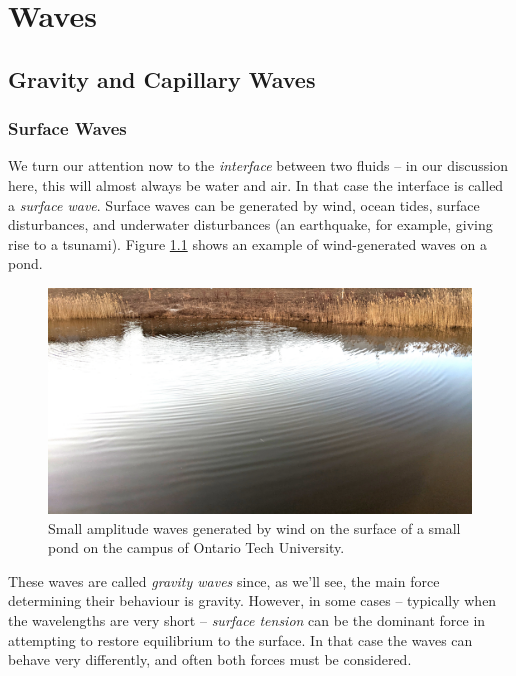 \chapter{Waves}

%
%

\section{Gravity and Capillary Waves}



\subsection{Surface Waves}

We turn our attention now to the \emph{interface} between two fluids -- in our discussion here, this will almost always be water and air.  In that case the interface is called a \emph{surface wave}.  Surface waves can be generated by wind, ocean tides, surface disturbances, and underwater disturbances (an earthquake, for example, giving rise to a tsunami).  Figure \ref{fig_pond} shows an example of wind-generated waves on a pond.  

\begin{figure}
\centering\includegraphics[width=0.9\linewidth]{Figures/Chapter5/fig_pond_waves}
\caption{Small amplitude waves generated by wind on the surface of a small pond on the campus of Ontario Tech University.}
\label{fig_pond}
\end{figure}

These waves are called \emph{gravity waves} since, as we'll see, the main force determining their behaviour is gravity.  However, in some cases -- typically when the wavelengths are very short -- \emph{surface tension} can be the dominant force in attempting to restore equilibrium to the surface.  In that case the waves can behave very differently, and often both forces must be considered.


